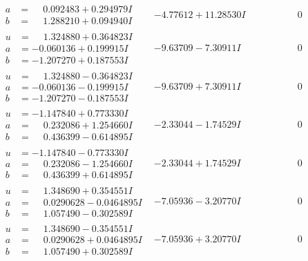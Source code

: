 \documentclass[1p]{elsarticle_modified}
\theoremstyle{definition}
\begin{document}
$$\begin{array}{c|c|c}
\begin{aligned}
a &= \phantom{-}0.092483 + 0.294979 I \\
b &= \phantom{-}1.288210 + 0.094940 I\end{aligned}
 & -4.77612 + 11.28530 I & \phantom{-0.000000 } 0 \\ \hline\begin{aligned}
u &= \phantom{-}1.324880 + 0.364823 I \\
a &= -0.060136 + 0.199915 I \\
b &= -1.207270 + 0.187553 I\end{aligned}
 & -9.63709 - 7.30911 I & \phantom{-0.000000 } 0 \\ \hline\begin{aligned}
u &= \phantom{-}1.324880 - 0.364823 I \\
a &= -0.060136 - 0.199915 I \\
b &= -1.207270 - 0.187553 I\end{aligned}
 & -9.63709 + 7.30911 I & \phantom{-0.000000 } 0 \\ \hline\begin{aligned}
u &= -1.147840 + 0.773330 I \\
a &= \phantom{-}0.232086 + 1.254660 I \\
b &= \phantom{-}0.436399 - 0.614895 I\end{aligned}
 & -2.33044 - 1.74529 I & \phantom{-0.000000 } 0 \\ \hline\begin{aligned}
u &= -1.147840 - 0.773330 I \\
a &= \phantom{-}0.232086 - 1.254660 I \\
b &= \phantom{-}0.436399 + 0.614895 I\end{aligned}
 & -2.33044 + 1.74529 I & \phantom{-0.000000 } 0 \\ \hline\begin{aligned}
u &= \phantom{-}1.348690 + 0.354551 I \\
a &= \phantom{-}0.0290628 - 0.0464895 I \\
b &= \phantom{-}1.057490 - 0.302589 I\end{aligned}
 & -7.05936 - 3.20770 I & \phantom{-0.000000 } 0 \\ \hline\begin{aligned}
u &= \phantom{-}1.348690 - 0.354551 I \\
a &= \phantom{-}0.0290628 + 0.0464895 I \\
b &= \phantom{-}1.057490 + 0.302589 I\end{aligned}
 & -7.05936 + 3.20770 I & \phantom{-0.000000 } 0\\

\end{array}$$
\end{document}
